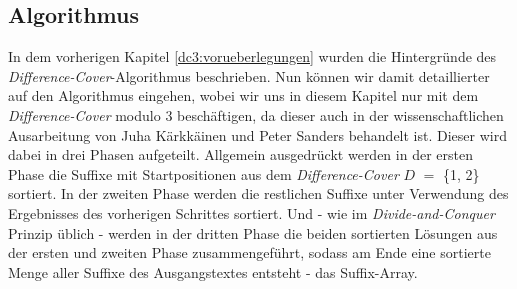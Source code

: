 \subsection{Algorithmus}
\label{dc3:algorithmus}

In dem vorherigen Kapitel \ref{dc3:vorueberlegungen} wurden die Hintergründe des \emph{Difference-Cover}-Algorithmus beschrieben. Nun können wir damit detaillierter auf den Algorithmus eingehen, wobei wir uns in diesem Kapitel nur mit dem \emph{Difference-Cover} modulo $3$ beschäftigen, da dieser auch in der wissenschaftlichen Ausarbeitung von Juha Kärkkäinen und Peter Sanders behandelt ist. Dieser wird dabei in drei Phasen aufgeteilt. Allgemein ausgedrückt werden in der ersten Phase die Suffixe mit Startpositionen aus dem \emph{Difference-Cover} \(D\) $=$ \{1, 2\} sortiert. In der zweiten Phase werden die restlichen Suffixe unter Verwendung des Ergebnisses des vorherigen Schrittes sortiert. Und - wie im \emph{Divide-and-Conquer} Prinzip üblich - werden in der dritten Phase die beiden sortierten Lösungen aus der ersten und zweiten Phase zusammengeführt, sodass am Ende eine sortierte Menge aller Suffixe des Ausgangstextes entsteht - das Suffix-Array.





